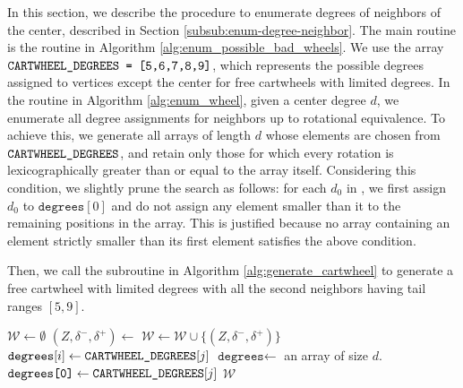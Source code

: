 \documentclass[main.tex]{subfiles}
\begin{document}
In this section, we describe the procedure to enumerate degrees of neighbors of the center, described in Section \ref{subsub:enum-degree-neighbor}.
The main routine is the \enumPossibleBadWheels routine in Algorithm \ref{alg:enum_possible_bad_wheels}.
We use the array $\texttt{CARTWHEEL\_DEGREES} \texttt{ = [5,6,7,8,9]}$, which represents the possible degrees assigned to vertices except the center for free cartwheels with limited degrees.
In the \enumWheels routine in Algorithm \ref{alg:enum_wheel}, given a center degree $d$, we enumerate all degree assignments for neighbors up to rotational equivalence.
To achieve this, we generate all arrays of length $d$ whose elements are chosen from $\texttt{CARTWHEEL\_DEGREES}$, and retain only those for which every rotation is lexicographically greater than or equal to the array itself.
Considering this condition, we slightly prune the search as follows: for each $d_0$ in \CARTWHEELDEGREES, we first assign $d_0$ to $\texttt{degrees}[0]$ and do not assign any element smaller than it to the remaining positions in the array.
This is justified because no array containing an element strictly smaller than its first element satisfies the above condition.

Then, we call the \generateCartwheel subroutine in Algorithm \ref{alg:generate_cartwheel} to generate a free cartwheel with limited degrees with all the second neighbors having tail ranges $[5,9]$.

\begin{algorithm}[H]
    \caption{\enumWheelsWithLink($d$)}
    \label{alg:enum_wheel}
    \begin{algorithmic}[1]
        \State $\mathcal{W} \gets \emptyset$
                    \State \Return
                \EndIf
                \State $(Z, \delta^-, \delta^+) \gets$ 
                \State $\mathcal{W} \gets \mathcal{W} \cup \{(Z, \delta^-, \delta^+)\}$
                \State \Return
            \EndIf
                \State $\texttt{degrees}[i] \gets \texttt{CARTWHEEL\_DEGREES}[j]$
                \State {}
            \EndFor
            \State \Return
        \EndProcedure
        \State $\texttt{degrees} \gets$ an array of size $d$.
            \State $\texttt{degrees[0]} \gets \texttt{CARTWHEEL\_DEGREES}[j]$
            \State {}
        \EndFor
        \State \Return $\mathcal{W}$
    \end{algorithmic}
\end{algorithm}
\end{document}
